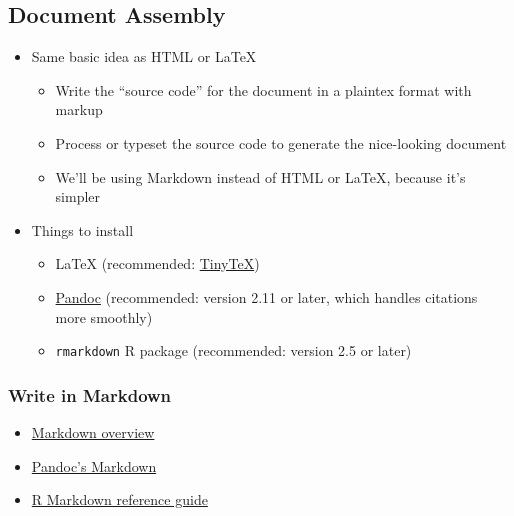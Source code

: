 \documentclass[
]{article}
\providecommand{\tightlist}{%
  \setlength{\itemsep}{0pt}\setlength{\parskip}{0pt}}
\begin{document}
\hypertarget{document-assembly}{%
\subsection{Document Assembly}\label{document-assembly}}

\begin{itemize}
\tightlist
\item
  Same basic idea as HTML or LaTeX

  \begin{itemize}
  \tightlist
  \item
    Write the ``source code'' for the document in a plaintex format with markup
  \item
    Process or typeset the source code to generate the nice-looking document
  \item
    We'll be using Markdown instead of HTML or LaTeX, because it's simpler
  \end{itemize}
\item
  Things to install

  \begin{itemize}
  \tightlist
  \item
    LaTeX (recommended: \href{https://yihui.name/tinytex/}{TinyTeX})
  \item
    \href{https://pandoc.org/}{Pandoc} (recommended: version 2.11 or later, which handles citations more smoothly)
  \item
    \texttt{rmarkdown} R package (recommended: version 2.5 or later)
  \end{itemize}
\end{itemize}

\hypertarget{write-in-markdown}{%
\subsubsection{Write in Markdown}\label{write-in-markdown}}

\begin{itemize}
\tightlist
\item
  \href{https://daringfireball.net/projects/markdown/}{Markdown overview}
\item
  \href{https://pandoc.org/MANUAL.html\#pandocs-markdown}{Pandoc's Markdown}
\item
  \href{https://rstudio.com/wp-content/uploads/2015/03/RMarkdown-reference.pdf}{R Markdown reference guide}
\end{itemize}
\end{document}

